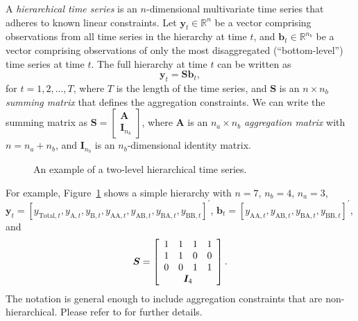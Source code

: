 \documentclass[
  11pt]{article}
\theoremstyle{plain}
\theoremstyle{remark}
\begin{document}
A \emph{hierarchical time series} is an \(n\)-dimensional multivariate
time series that adheres to known linear constraints. Let
\(\bm{y}_t \in \mathbb{R}^n\) be a vector comprising observations from
all time series in the hierarchy at time \(t\), and
\(\bm{b}_t \in \mathbb{R}^{n_b}\) be a vector comprising observations of
only the most disaggregated (``bottom-level'') time series at time
\(t\). The full hierarchy at time \(t\) can be written as \[
\bm{y}_t = \bm{S}\bm{b}_t,
\] for \(t=1,2,\ldots,T\), where \(T\) is the length of the time series,
and \(\bm{S}\) is an \(n \times n_b\) \emph{summing matrix} that defines
the aggregation constraints. We can write the summing matrix as
\(\bm{S} = \left[\begin{array}{c}\bm{A} \\ \bm{I}_{n_b}\end{array}\right]\),
where \(\bm{A}\) is an \(n_a \times n_b\) \emph{aggregation matrix} with
\(n = n_a + n_b\), and \(\bm{I}_{n_b}\) is an \(n_b\)-dimensional
identity matrix.

\begin{figure}[!t]


\caption{\label{fig-hts}An example of a two-level hierarchical time
series.}

\end{figure}%

For example, Figure~\ref{fig-hts} shows a simple hierarchy with
\(n = 7\), \(n_b = 4\), \(n_a = 3\),
\(\bm{y}_t = [y_{\text{Total},t}, y_{\text{A},t}, y_{\text{B},t}, y_{\text{AA},t}, y_{\text{AB},t}, y_{\text{BA},t}, y_{\text{BB},t}]^{\prime}\),
\(\bm{b}_t = [y_{\text{AA},t}, y_{\text{AB},t}, y_{\text{BA},t}, y_{\text{BB},t}]^{\prime}\),
and \[
\bm{S} = \left[
\begin{array}{cccc}
1 & 1 & 1 & 1 \\
1 & 1 & 0 & 0 \\
0 & 0 & 1 & 1 \\
\multicolumn{4}{c}{\bm{I}_4}
\end{array}\right].
\] The notation is general enough to include aggregation constraints
that are non-hierarchical. Please refer to \citet{Hyndman2021-fo} for
further details.
\end{document}
